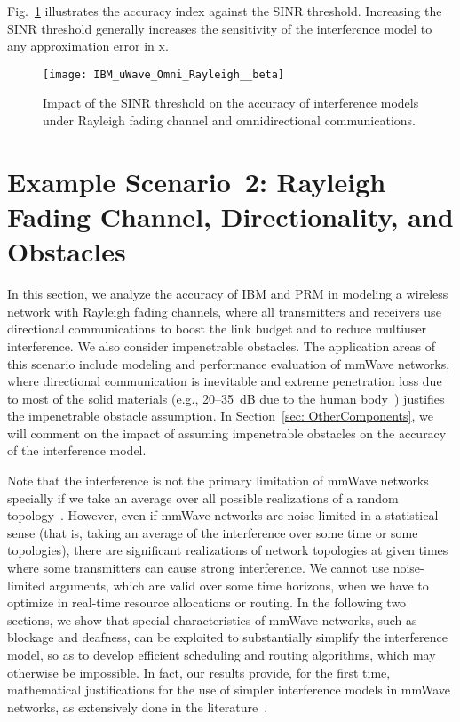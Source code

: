 \documentclass[12pt, draftclsnofoot, onecolumn]{IEEEtran}
\begin{document}
Fig.~\ref{fig: IBM_uWave_Omni_Rayleigh__beta} illustrates the accuracy index against the SINR threshold. Increasing the SINR threshold generally increases the sensitivity of the interference model to any approximation error in $\mathrm{x}$.
\begin{figure}[!t]
  \centering
  \texttt{[image: IBM\_uWave\_Omni\_Rayleigh\_\_beta]}

  \caption{Impact of the SINR threshold on the accuracy of interference models under Rayleigh fading channel and omnidirectional communications.}
  \label{fig: IBM_uWave_Omni_Rayleigh__beta}
\vspace{-7mm}
\end{figure}


\section{Example Scenario~2: Rayleigh Fading Channel, Directionality, and Obstacles}\label{sec: Rayleigh-Blockage}
In this section, we analyze the accuracy of IBM and PRM in modeling a wireless network with Rayleigh fading channels, where all transmitters and receivers use directional communications to boost the link budget and to reduce multiuser interference. We also consider impenetrable obstacles. The application areas of this scenario include modeling and performance evaluation of mmWave networks, where directional communication is inevitable and extreme penetration loss due to most of the solid materials (e.g., 20--35~dB due to the human body~\cite{Rangan2014Millimeter}) justifies the impenetrable obstacle assumption. In Section~\ref{sec: OtherComponents}, we will comment on the impact of assuming impenetrable obstacles on the accuracy of the interference model.

Note that the interference is not the primary limitation of mmWave networks specially if we take an average over all possible realizations of a random topology~\cite{di2014stochastic,Shokri2015Transitional}. However, even if mmWave networks are noise-limited in a statistical sense (that is, taking an average of the interference over some time or some topologies), there are significant realizations of network topologies at given times where some transmitters can cause strong interference. We cannot use noise-limited arguments, which are valid over some time horizons, when we have to optimize in real-time resource allocations or routing. In the following two sections, we show that special characteristics of mmWave networks, such as blockage and deafness, can be exploited to substantially simplify the interference model, so as to develop efficient scheduling and routing algorithms, which may otherwise be impossible. In fact, our results provide, for the first time, mathematical justifications for the use of simpler interference models in mmWave networks, as extensively done in the literature~\cite{Singh2011Interference,Singh2010Distributed,an2008directional,son2012frame,petrov2017interference,garcia2015analysis,Yu2016Distributed,Stahlbuhk2016Topology}.
\end{document}

